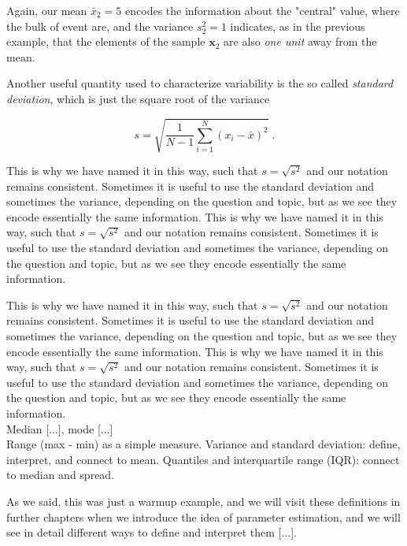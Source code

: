 \documentclass{book}
\begin{document}
Again, our mean $\bar{x}_2 = 5$ encodes the information about the "central" value, where the bulk of event are, and the variance $s^2_2 = 1$ indicates, as in the previous example, that the elements of the sample $\textbf{x}_2$ are also \textit{one unit} away from the mean.

\medskip

Another useful quantity used to characterize variability is the so called \textit{standard deviation}, which is just the square root of the variance

\begin{equation}
	s = \sqrt{\frac{1}{N - 1} \sum_{i = 1}^{N} (x_{i} - \bar{x})^{2}} \; . 
\end{equation}

This is why we have named it in this way, such that $s = \sqrt{s^{2}}$ and our notation remains consistent. Sometimes it is useful to use the standard deviation and sometimes the variance, depending on the question and topic, but as we see they encode essentially the same information. This is why we have named it in this way, such that $s = \sqrt{s^{2}}$ and our notation remains consistent. Sometimes it is useful to use the standard deviation and sometimes the variance, depending on the question and topic, but as we see they encode essentially the same information.

\medskip

This is why we have named it in this way, such that $s = \sqrt{s^{2}}$ and our notation remains consistent. Sometimes it is useful to use the standard deviation and sometimes the variance, depending on the question and topic, but as we see they encode essentially the same information. This is why we have named it in this way, such that $s = \sqrt{s^{2}}$ and our notation remains consistent. Sometimes it is useful to use the standard deviation and sometimes the variance, depending on the question and topic, but as we see they encode essentially the same information.\\

Median [...], mode [...] \\

Range (max - min) as a simple measure. Variance and standard deviation: define, interpret, and connect to mean. Quantiles and interquartile range (IQR): connect to median and spread.

\medskip

As we said, this was just a warmup example, and we will visit these definitions in further chapters when we introduce the idea of parameter estimation, and we will see in detail different ways to define and interpret them [...].
\end{document}
